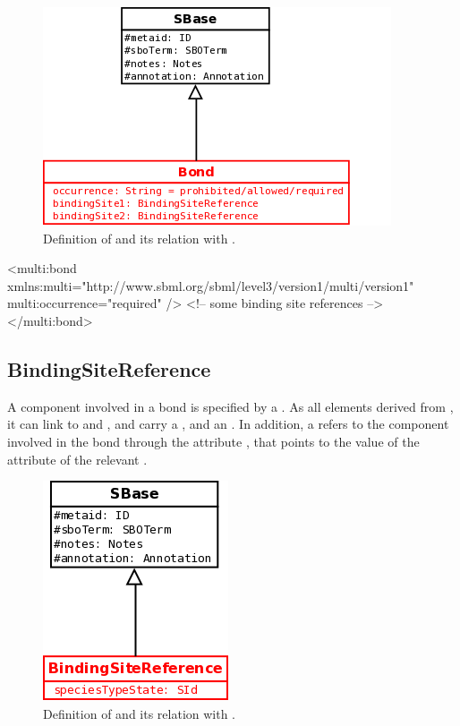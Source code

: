 \begin{figure}[H]
\begin{center}
\includegraphics[scale=0.5]{figs/pngs/BondClass.png} 
\caption{Definition of  and its relation with .}
\label{fig:BondClass}
\end{center}
\end{figure}

\begin{example}
<multi:bond xmlns:multi="http://www.sbml.org/sbml/level3/version1/multi/version1" 
            multi:occurrence="required" />
  <!-- some binding site references -->
</multi:bond>
\end{example}

\subsection{BindingSiteReference}

A component involved in a bond is specified by a . As all elements derived from , it can link to  and , and carry a , and an . In addition, a  refers to the component involved in the bond through the attribute , that points to the value of the  attribute of the relevant .

\begin{figure}[H]
\begin{center}
\includegraphics[scale=0.3]{figs/pngs/BindingSiteReferenceClass.png} 
\caption{Definition of  and its relation with .}
\label{fig:BindingSiteReferenceClass}
\end{center}
\end{figure}

